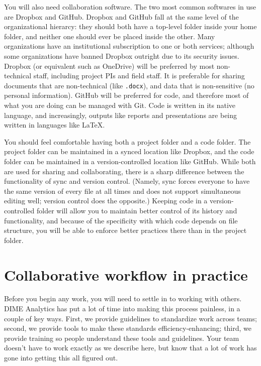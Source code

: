 You will also need collaboration software.
The two most common softwares in use are Dropbox and GitHub.
Dropbox and GitHub fall at the same level of the organizational hierarcy:
they should both have a top-level folder inside your home folder,
and neither one should ever be placed inside the other.
Many organizations have an institutional subscription to one or both services;
although some organizations have banned Dropbox outright due to its security issues.
Dropbox (or equivalent such as OneDrive) will be preferred by most non-technical staff,
including project PIs and field staff.
It is preferable for sharing documents that are non-technical (like \texttt{.docx}),
and data that is non-sensitive (no personal information).
GitHub will be preferred for code,
and therefore most of what you are doing can be managed with Git.
Code is written in its native language,
and increasingly, outputs like reports
and presentations
are being written in languages like \LaTeX.

You should feel comfortable having both a project folder and a code folder.
The project folder can be maintained in a synced location like Dropbox,
and the code folder can be maintained in a version-controlled location like GitHub.
While both are used for sharing and collaborating,
there is a sharp difference between the functionality of sync and version control.
(Namely, sync forces everyone to have the same version of every file at all times
and does not support simultaneous editing well; version control does the opposite.)
Keeping code in a version-controlled folder will allow you
to maintain better control of its history and functionality,
and because of the specificity with which code depends on file structure,
you will be able to enforce better practices there than in the project folder.


\section{Collaborative workflow in practice}

Before you begin any work, you will need to settle in to working with others.
DIME Analytics has put a lot of time into making this process painless,
in a couple of key ways.
First, we provide guidelines to standardize work across teams;
second, we provide tools to make these standards efficiency-enhancing;
third, we provide training so people understand these tools and guidelines.
Your team doesn't have to work exactly as we describe here,
but know that a lot of work has gone into getting this all figured out.

